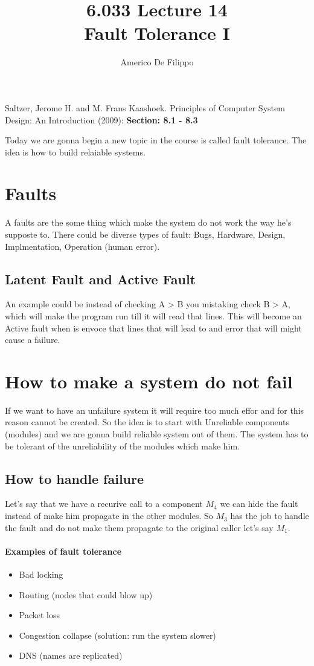 \documentclass{article}
\title{6.033 Lecture 14 \\ Fault Tolerance I}
\author{Americo De Filippo}
\begin{document}
 
  \maketitle
  \begin{thebibliography}{9}
    Saltzer, Jerome H. and M. Frans Kaashoek. Principles of Computer System Design: An Introduction (2009): \textbf{Section: 8.1 - 8.3}
  \end{thebibliography}
  Today we are gonna begin a new topic in the course is called fault tolerance. The idea
  is how to build relaiable systems.
  \section{Faults}
    A faults are the some thing which make the system do not work the way he's supposte to.
    There could be diverse types of fault: Bugs, Hardware, Design, Implmentation, Operation
    (human error).
    \subsection{Latent Fault and Active Fault}
      An example could be instead of checking A > B you mistaking check B > A, which will make
      the program run till it will read that lines. This will become an Active fault when is
      envoce that lines that will lead to and error that will might cause a failure.
  \section{How to make a system do not fail}
    If we want to have an unfailure system it will require too much effor and for this reason
    cannot be created. So the idea is to start with Unreliable components (modules) and we are
    gonna build reliable system out of them. The system has to be tolerant of the unreliability
    of the modules which make him. 
    \subsection{How to handle failure}
      Let's say that we have a recurive call to a component $M_4$ we can hide the fault instead 
      of make him propagate in the other modules. So $M_3$ has the job to handle the fault
      and do not make them propagate to the original caller let's say $M_1$.
      \paragraph{Examples of fault tolerance} 
      \begin{itemize}
        \item Bad locking
        \item Routing (nodes that could blow up)
        \item Packet loss
        \item Congestion collapse (solution: run the system slower)
        \item DNS (names are replicated)
      \end{itemize}
\end{document}
